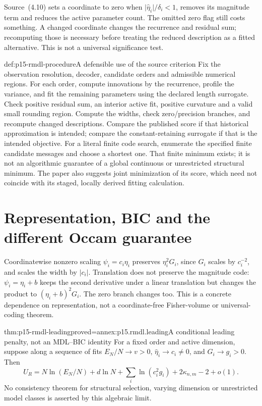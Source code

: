 Source~(4.10) sets a coordinate to zero when
\(\lvert\widehat\eta_i\rvert/\delta_i<1\), removes its magnitude term
and reduces the active parameter count. The omitted zero flag still costs
something. A changed coordinate changes the recurrence and residual sum;
recomputing those is necessary before treating the reduced description as
a fitted alternative. This is not a universal significance test.

\begin{hbmethod}{def:p15-rmdl-procedure}{A defensible use of the source criterion}
Fix the observation resolution, decoder, candidate orders and admissible
numerical regions. For each order, compute innovations by the recurrence,
profile the variance, and fit the remaining parameters using the declared
length surrogate. Check positive residual sum, an interior active fit,
positive curvature and a valid small rounding region. Compute the widths,
check zero/precision branches, and recompute changed descriptions. Compare
the published score if that historical approximation is intended; compare
the constant-retaining surrogate if that is the intended objective.
For a literal finite code search, enumerate the specified finite candidate
messages and choose a shortest one. That finite minimum exists; it is not
an algorithmic guarantee of a global continuous or unrestricted structural
minimum. The paper also suggests joint minimization of its score, which
need not coincide with its staged, locally derived fitting calculation.
\end{hbmethod}

\section{Representation, BIC and the different Occam guarantee}
\label{sec:p15-rmdl-comparisons}

Coordinatewise nonzero scaling \(\psi_i=c_i\eta_i\) preserves
\(\eta_i^2G_i\), since \(G_i\) scales by \(c_i^{-2}\), and scales
the width by \(\lvert c_i\rvert\). Translation does not preserve the
magnitude code: \(\psi_i=\eta_i+b\) keeps the second derivative under
a linear translation but changes the product to \((\eta_i+b)^2G_i\).
The zero branch changes too. This is a concrete dependence on representation,
not a coordinate-free Fisher-volume or universal-coding theorem.

\begin{hblemma}{thm:p15-rmdl-leading}{proved=annex:p15.rmdl.leading}{A conditional leading penalty, not an MDL–BIC identity}
For a fixed order and active dimension, suppose along a sequence of fits
\(E_N/N\to v>0\), \(\widehat\eta_i\to c_i\ne0\), and
\(G_i\to g_i>0\). Then
\[
 U_R=N\ln(E_N/N)+d\ln N
      +\sum_i\ln(c_i^2g_i)+2\kappa_{n,m}-2+o(1).
\]
No consistency theorem for structural selection, varying dimension or
unrestricted model classes is asserted by this algebraic limit.
\end{hblemma}

